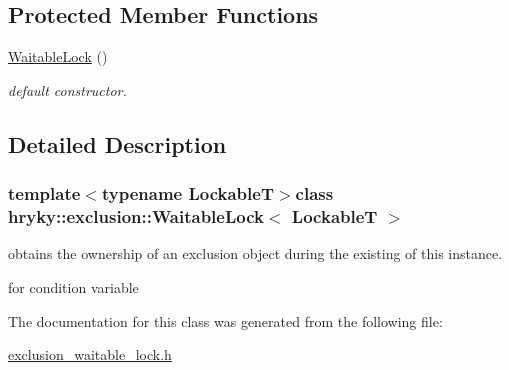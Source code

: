 \subsection*{Protected Member Functions}
\begin{DoxyCompactItemize}
\item 
\hypertarget{classhryky_1_1exclusion_1_1_waitable_lock_a19be1a19921bc2a0cab7e4b9334fa838}{\hyperlink{classhryky_1_1exclusion_1_1_waitable_lock_a19be1a19921bc2a0cab7e4b9334fa838}{Waitable\-Lock} ()}\label{classhryky_1_1exclusion_1_1_waitable_lock_a19be1a19921bc2a0cab7e4b9334fa838}

\begin{DoxyCompactList}\small\item\em default constructor. \end{DoxyCompactList}\end{DoxyCompactItemize}


\subsection{Detailed Description}
\subsubsection*{template$<$typename Lockable\-T$>$class hryky\-::exclusion\-::\-Waitable\-Lock$<$ Lockable\-T $>$}

obtains the ownership of an exclusion object during the existing of this instance. 


\begin{DoxyItemize}
\item for condition variable 
\end{DoxyItemize}

The documentation for this class was generated from the following file\-:\begin{DoxyCompactItemize}
\item 
\hyperlink{exclusion__waitable__lock_8h}{exclusion\-\_\-waitable\-\_\-lock.\-h}\end{DoxyCompactItemize}
